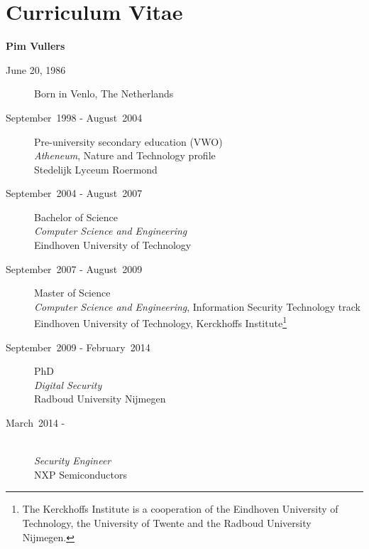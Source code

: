 \chapter*{Curriculum Vitae}

\begin{center}\Large
  \textbf{Pim Vullers}
  \vspace{8mm}
\end{center}

\begin{description}
  \item[June 20, 1986] Born in Venlo, The Netherlands
  \item[September~1998 - August~2004] Pre-university secondary education (VWO) \\
    \emph{Atheneum}, Nature and Technology profile \\
    Stedelijk Lyceum Roermond

  \item[September~2004 - August~2007] Bachelor of Science \\
    \emph{Computer Science and Engineering} \\
    Eindhoven University of Technology

  \item[September~2007 - August~2009] Master of Science \\
    \emph{Computer Science and Engineering}, Information Security Technology track \\
    Eindhoven University of Technology, Kerckhoffs Institute\footnote{The Kerckhoffs Institute is a cooperation of the Eindhoven University of Technology, the University of Twente and the Radboud University Nijmegen.}

  \item[September~2009 - February~2014] PhD \\
    \emph{Digital Security} \\
    Radboud University Nijmegen

  \item[March~2014 - ] ~\\
    \emph{Security Engineer} \\
    NXP Semiconductors

\end{description}

